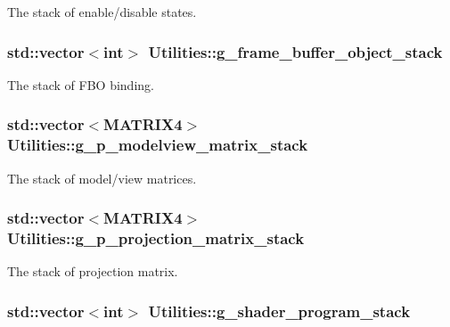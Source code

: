 The stack of enable/disable states. 

\hypertarget{namespace_utilities_a0c685e4387f8e43c77ef5931a213cfaf}{
\subsubsection[{g\_\-frame\_\-buffer\_\-object\_\-stack}]{\setlength{\rightskip}{0pt plus 5cm}std::vector$<$int$>$ {\bf Utilities::g\_\-frame\_\-buffer\_\-object\_\-stack}}}
\label{namespace_utilities_a0c685e4387f8e43c77ef5931a213cfaf}


The stack of FBO binding. 

\hypertarget{namespace_utilities_af9f46e572978db79176b61edb1780b3c}{
\subsubsection[{g\_\-p\_\-modelview\_\-matrix\_\-stack}]{\setlength{\rightskip}{0pt plus 5cm}std::vector$<${\bf MATRIX4}$>$ {\bf Utilities::g\_\-p\_\-modelview\_\-matrix\_\-stack}}}
\label{namespace_utilities_af9f46e572978db79176b61edb1780b3c}


The stack of model/view matrices. 

\hypertarget{namespace_utilities_a3e2a3a6c251bba50ffe4c069d085e0b7}{
\subsubsection[{g\_\-p\_\-projection\_\-matrix\_\-stack}]{\setlength{\rightskip}{0pt plus 5cm}std::vector$<${\bf MATRIX4}$>$ {\bf Utilities::g\_\-p\_\-projection\_\-matrix\_\-stack}}}
\label{namespace_utilities_a3e2a3a6c251bba50ffe4c069d085e0b7}


The stack of projection matrix. 

\hypertarget{namespace_utilities_adf21242b77777527da1f9e6d8f72a1e5}{
\subsubsection[{g\_\-shader\_\-program\_\-stack}]{\setlength{\rightskip}{0pt plus 5cm}std::vector$<$int$>$ {\bf Utilities::g\_\-shader\_\-program\_\-stack}}}
\label{namespace_utilities_adf21242b77777527da1f9e6d8f72a1e5}


